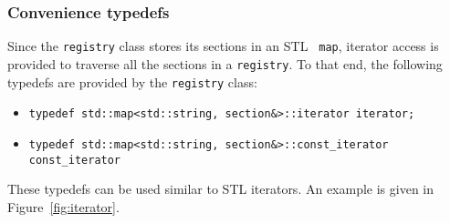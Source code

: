 \subsubsection{Convenience typedefs}

Since the {\tt registry} class stores its sections in an STL {\tt
  map}, iterator access is provided to traverse all the sections in a
{\tt registry}.  To that end, the following typedefs are provided by
the {\tt registry} class:

\begin{itemize}
\item {\tt typedef std::map<std::string, section\&>::iterator iterator;}
\item {\tt typedef std::map<std::string, section\&>::const\_iterator
const\_iterator}
\end{itemize}

These typedefs can be used similar to STL iterators.  An example is
given in Figure~\ref{fig:iterator}.

